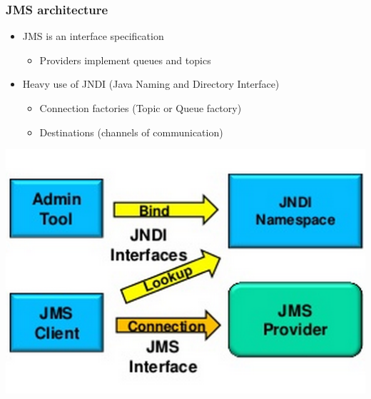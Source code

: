 \documentclass[10pt,xcolor=pdflatex]{beamer}
\begin{document}
\begin{frame}[containsverbatim]\frametitle{JMS architecture}
\begin{itemize}
	\item JMS is an interface specification
	  \begin{itemize}
		\item Providers implement queues and topics
	  \end{itemize}
    \item Heavy use of JNDI (Java Naming and Directory Interface)
	  \begin{itemize}
		\item Connection factories (Topic or Queue factory)
		\item Destinations (channels of communication)
	  \end{itemize}
\end{itemize}
\begin{center}
\includegraphics[scale=0.55]{img/obr4}
\end{center}
\end{frame}
\end{document}
